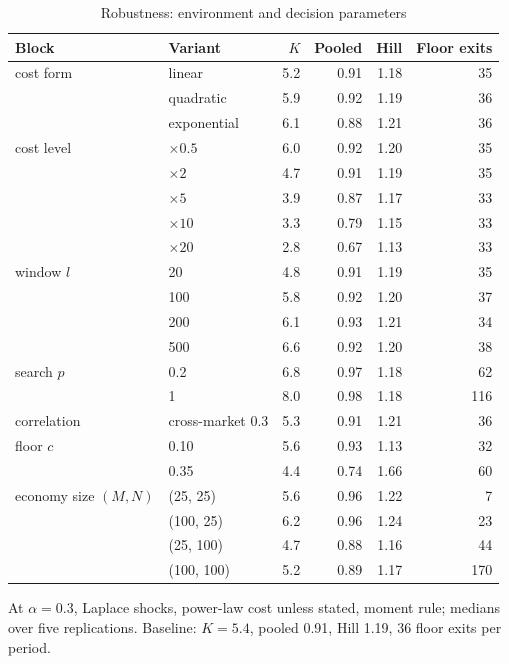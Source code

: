\begin{table}[htbp]
\centering
\caption{Robustness: environment and decision parameters}
\label{tab:robustness}
\small
\begin{tabular}{llrrrr}
\toprule
Block & Variant & $K$ & Pooled & Hill & Floor exits \\
\midrule
cost form & linear & 5.2 & 0.91 & 1.18 & 35 \\
 & quadratic & 5.9 & 0.92 & 1.19 & 36 \\
 & exponential & 6.1 & 0.88 & 1.21 & 36 \\
\midrule
cost level & $\times 0.5$ & 6.0 & 0.92 & 1.20 & 35 \\
 & $\times 2$ & 4.7 & 0.91 & 1.19 & 35 \\
 & $\times 5$ & 3.9 & 0.87 & 1.17 & 33 \\
 & $\times 10$ & 3.3 & 0.79 & 1.15 & 33 \\
 & $\times 20$ & 2.8 & 0.67 & 1.13 & 33 \\
\midrule
window $l$ & 20 & 4.8 & 0.91 & 1.19 & 35 \\
 & 100 & 5.8 & 0.92 & 1.20 & 37 \\
 & 200 & 6.1 & 0.93 & 1.21 & 34 \\
 & 500 & 6.6 & 0.92 & 1.20 & 38 \\
\midrule
search $p$ & 0.2 & 6.8 & 0.97 & 1.18 & 62 \\
 & 1 & 8.0 & 0.98 & 1.18 & 116 \\
\midrule
correlation & cross-market 0.3 & 5.3 & 0.91 & 1.21 & 36 \\
\midrule
floor $c$ & 0.10 & 5.6 & 0.93 & 1.13 & 32 \\
 & 0.35 & 4.4 & 0.74 & 1.66 & 60 \\
\midrule
economy size $(M, N)$ & (25, 25) & 5.6 & 0.96 & 1.22 & 7 \\
 & (100, 25) & 6.2 & 0.96 & 1.24 & 23 \\
 & (25, 100) & 4.7 & 0.88 & 1.16 & 44 \\
 & (100, 100) & 5.2 & 0.89 & 1.17 & 170 \\
\bottomrule
\end{tabular}
\par\smallskip\begin{minipage}{0.95\linewidth}\footnotesize At $\alpha = 0.3$, Laplace shocks, power-law cost unless stated, moment rule; medians over five replications. Baseline: $K = 5.4$, pooled 0.91, Hill 1.19, 36 floor exits per period. \end{minipage}
\end{table}
